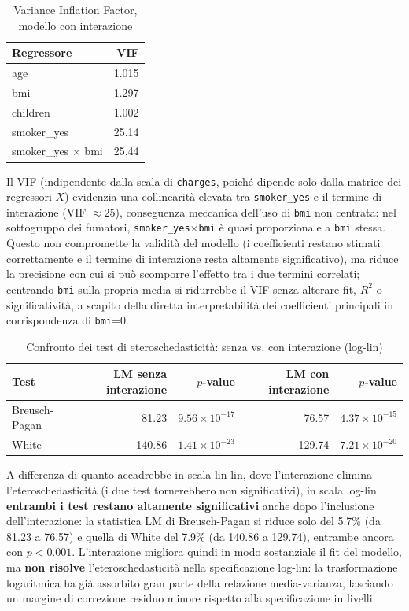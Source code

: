\documentclass[11pt,a4paper]{article}
\begin{document}
\begin{table}[H]
\centering
\caption{Variance Inflation Factor, modello con interazione}
\label{tab:vif_interazione}
\begin{tabular}{lr}
\toprule
Regressore & VIF \\
\midrule
age                       & 1.015 \\
bmi                       & 1.297 \\
children                  & 1.002 \\
smoker\_yes                & 25.14 \\
smoker\_yes $\times$ bmi   & 25.44 \\
\bottomrule
\end{tabular}
\end{table}

Il VIF (indipendente dalla scala di \texttt{charges}, poiché dipende solo
dalla matrice dei regressori $X$) evidenzia una collinearità elevata tra
\texttt{smoker\_yes} e il termine di interazione (VIF $\approx25$),
conseguenza meccanica dell'uso di \texttt{bmi} non centrata: nel
sottogruppo dei fumatori, \texttt{smoker\_yes}$\times$\texttt{bmi} è
quasi proporzionale a \texttt{bmi} stessa. Questo non compromette la
validità del modello (i coefficienti restano stimati correttamente e il
termine di interazione resta altamente significativo), ma riduce la
precisione con cui si può scomporre l'effetto tra i due termini correlati;
centrando \texttt{bmi} sulla propria media si ridurrebbe il VIF senza
alterare fit, $R^2$ o significatività, a scapito della diretta
interpretabilità dei coefficienti principali in corrispondenza di
\texttt{bmi}=0.

\begin{table}[H]
\centering
\caption{Confronto dei test di eteroschedasticità: senza vs. con interazione (log-lin)}
\label{tab:bp_white_interazione}
\begin{tabular}{lrrrr}
\toprule
Test & LM senza interazione & $p$-value & LM con interazione & $p$-value \\
\midrule
Breusch-Pagan & 81.23 & $9.56\times10^{-17}$ & 76.57  & $4.37\times10^{-15}$ \\
White         & 140.86 & $1.41\times10^{-23}$ & 129.74 & $7.21\times10^{-20}$ \\
\bottomrule
\end{tabular}
\end{table}

A differenza di quanto accadrebbe in scala lin-lin, dove l'interazione
elimina l'eteroschedasticità (i due test tornerebbero non significativi),
in scala log-lin \textbf{entrambi i test restano altamente significativi}
anche dopo l'inclusione dell'interazione: la statistica LM di
Breusch-Pagan si riduce solo del 5.7\% (da 81.23 a 76.57) e quella di
White del 7.9\% (da 140.86 a 129.74), entrambe ancora con $p<0.001$.
L'interazione migliora quindi in modo sostanziale il fit del modello, ma
\textbf{non risolve} l'eteroschedasticità nella specificazione log-lin: la
trasformazione logaritmica ha già assorbito gran parte della relazione
media-varianza, lasciando un margine di correzione residuo minore rispetto
alla specificazione in livelli.
\end{document}
